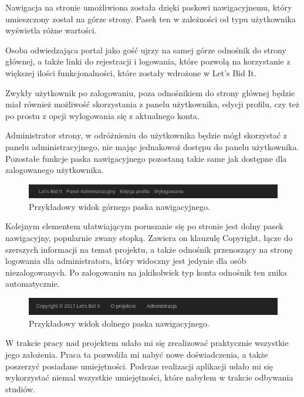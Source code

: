 \documentclass[brudnopis]{xmgr}
\begin{document}
Nawigacja na stronie umożliwiona została dzięki paskowi nawigacyjnemu, który umieszczony został na górze strony. Pasek ten w zależności od typu użytkownika wyświetla różne wartości.

Osoba odwiedzająca portal jako gość ujrzy na samej górze odnośnik do strony głównej, a także linki do rejestracji i logowania, które pozwolą na korzystanie z większej ilości funkcjonalności, które zostały wdrożone w Let's Bid It.

Zwykły użytkownik po zalogowaniu, poza odnośnikiem do strony głównej będzie miał również możliwość skorzystania z panelu użytkownika, edycji profilu, czy też po prostu z opcji wylogowania się z aktualnego konta.

Administrator strony, w odróżnieniu do użytkownika będzie mógł skorzystać z panelu administracyjnego, nie mając jednakowoż dostępu do panelu użytkownika. Pozostałe funkcje paska nawigacyjnego pozostaną takie same jak dostępne dla zalogowanego użytkownika.

\begin{figure}[!tbh]
\centering
\includegraphics[width=\linewidth]{fig/pasek}
\caption{Przykładowy widok górnego paska nawigacyjnego.}
\end{figure}

Kolejnym elementem ułatwiającym poruszanie się po stronie jest dolny pasek nawigacyjny, popularnie zwany stopką. Zawiera on klauzulę Copyright, łącze do szerszych informacji na temat projektu, a także odnośnik przenoszący na stronę logowania dla administratora, który widoczny jest jedynie dla osób niezalogowanych. Po zalogowaniu na jakikolwiek typ konta odnośnik ten znika automatycznie.
\begin{figure}[!tbh]
\centering
\includegraphics[width=\linewidth]{fig/stopka}
\caption{Przykładowy widok dolnego paska nawigacyjnego.}
\end{figure}


\summary
W trakcie pracy nad projektem udało mi się zrealizować praktycznie wszystkie jego założenia. Praca ta pozwoliła mi nabyć nowe doświadczenia, a także poszerzyć posiadane umiejętności. Podczas realizacji aplikacji udało mi się wykorzystać niemal wszystkie umiejętności, które nabyłem w trakcie odbywania studiów.
\end{document}
